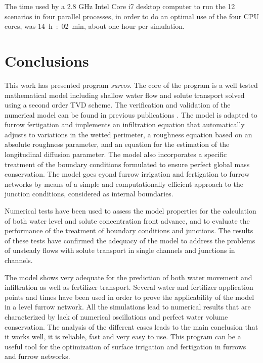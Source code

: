 \documentclass[review,authoryear]{elsarticle}
\begin{document}
The time used by a 2.8 GHz Intel Core i7 desktop computer to run the 12
scenarios in four parallel processes, in order to do an optimal use of the four
CPU cores, was 14~h~:~02~min, about one hour per simulation.

\section{Conclusions}

This work has presented program \emph{surcos}. The core of the program is a well
tested mathematical model including shallow water flow and solute transport
solved using a second order TVD scheme. The verification and validation of the
numerical model can be found in previous publications
\citep{JaviSurcos1,JaviSurcos2}. The model is adapted to furrow fertigation and
implements an infiltration equation that automatically adjusts to variations in
the wetted perimeter, a roughness equation based on an absolute roughness
parameter, and an equation for the estimation of the longitudinal diffusion
parameter. The model also incorporates a specific treatment of the boundary
conditions formulated to ensure perfect global mass conservation. The model goes
eyond furrow irrigation and fertigation to furrow networks by means of a simple
and computationally efficient approach to the junction conditions, considered as
internal boundaries.

Numerical tests have been used to assess the model properties for the
calculation of both water level and solute concentration front advance, and to
evaluate the performance of the treatment of boundary conditions and junctions.
The results of these tests have confirmed the adequacy of the model to address
the problems of unsteady flows with solute transport in single channels and
junctions in channels. 

The model shows very adequate for the prediction of both water movement and
infiltration as well as fertilizer transport. Several water and fertilizer
application points and times have been used in order to prove the applicability
of the model in a level furrow network. All the simulations lead to numerical
results that are characterized by lack of numerical oscillations and perfect
water volume conservation. The analysis of the different cases leads to the main
conclusion that it works well, it is reliable, fast and very easy to use. This
program can be a useful tool for the optimization of surface irrigation and
fertigation in furrows and furrow networks.
\end{document}
